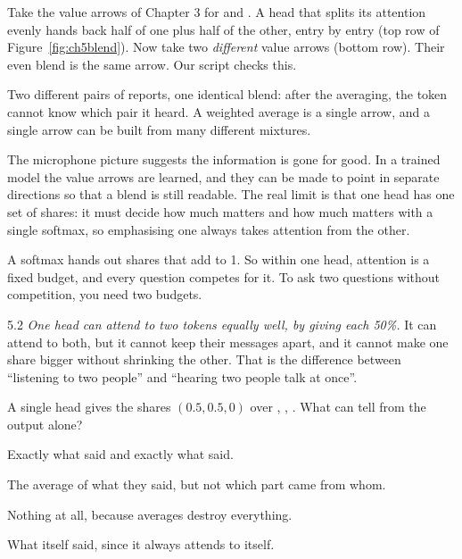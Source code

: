 \Exactly Take the value arrows of Chapter 3 for  and . A head that splits its
attention evenly hands back half of one plus half of the other, entry by entry (top row of
Figure~\ref{fig:ch5blend}). Now take two \emph{different} value arrows (bottom row). Their even blend is
the same arrow. Our script checks this.

\begin{center}
\fitwidthFourFive{}
\label{fig:ch5blend}
\end{center}
 Two different pairs of reports, one identical blend: after the
averaging, the token cannot know which pair it heard. A weighted average is a single arrow, and a single
arrow can be built from many different mixtures.

\begin{breaks}
The microphone picture suggests the information is gone for good. In a trained model the value arrows are
learned, and they can be made to point in separate directions so that a blend is still readable. The real
limit is that one head has one set of shares: it must decide how much  matters and how much
 matters with a single softmax, so emphasising one always takes attention from the other.
\end{breaks}

\Why A softmax hands out shares that add to 1. So within one head, attention is a fixed budget, and every
question competes for it. To ask two questions without competition, you need two budgets.

\begin{wrongidea}{5.2}
\emph{One head can attend to two tokens equally well, by giving each 50\%.} It can attend to both, but it
cannot keep their messages apart, and it cannot make one share bigger without shrinking the other. That is
the difference between ``listening to two people'' and ``hearing two people talk at once''.
\end{wrongidea}

\begin{checkq}
A single head gives  the shares $(0.5, 0.5, 0)$ over , , . What can
 tell from the output alone?
\begin{options}
\item Exactly what  said and exactly what  said.
\item The average of what they said, but not which part came from whom.
\item Nothing at all, because averages destroy everything.
\item What  itself said, since it always attends to itself.
\end{options}
\end{checkq}

